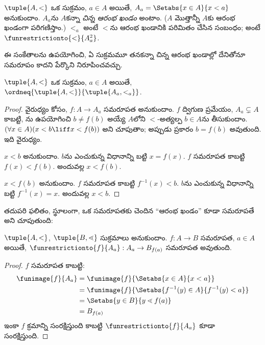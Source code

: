 \documentclass[../../../include/open-logic-section]{subfiles}
\begin{document}
\begin{defn}
$\tuple{A, <}$ ఒక సుక్రమం,
$a \in A$ అయితే,
$A_a = \Setabs{x \in A}{x
< a}$ అనుకుందాం.
$A_a$ను $A$కన్నా \emph{చిన్న ఆరంభ ఖండం} అంటాం.
($A$ మొత్తాన్నీ $A$కు ఆరంభ ఖండంగా పరిగణిస్తాం.) $<_a$
అంటే $<$ను ఆరంభ
ఖండానికి పరిమితం
చేసిన సంబంధం; అంటే
$\funrestrictionto{\mathord{<}}{A_a^2}$.
\end{defn}
\noindent
ఈ సంకేతాలను ఉపయోగించి, ఏ సుక్రమమూ
తనకన్నా చిన్న ఆరంభ ఖండాల్లో దేనితోనూ సమరూపం కాదని
పేర్కొని నిరూపించవచ్చు.

\begin{lem}
$\tuple{A, <}$ ఒక సుక్రమం,
$a \in A$ అయితే,
$\ordneq{\tuple{A, <}}{\tuple{A_a, <_a}}$.
\end{lem}

\begin{proof}
వైరుధ్యం కోసం,
$f \colon A \to A_a$
సమరూపత అనుకుందాం.
$f$ ద్విగుణ ప్రమేయం,
$A_a \subsetneq A$ కాబట్టి,
ను
ఉపయోగించి $b \neq f(b)$
అయ్యే $A$లోని $<$-అత్యల్ప
$b \in A$ను తీసుకుందాం.
$(\forall x \in A)(x<b \liff x < f(b))$
అని చూపుతాం; అప్పుడు
ప్రకారం $b =
f(b)$ అవుతుంది. ఇది వైరుధ్యం.

$x < b$ అనుకుందాం.
$b$ను ఎంచుకున్న విధానాన్ని బట్టి
$x = f(x)$.
$f$ సమరూపత కాబట్టి
$f(x) <
f(b)$. అందువల్ల
$x < f(b)$.

$x < f(b)$ అనుకుందాం.
$f$ సమరూపత కాబట్టి
$f^{-1}(x) < b$.
$b$ను ఎంచుకున్న విధానాన్ని బట్టి
$f^{-1}(x) = x$.
అందువల్ల $x < b$.
\end{proof}

తదుపరి ఫలితం, స్థూలంగా,
ఒక సమరూపతకు చెందిన ``ఆరంభ
ఖండం'' కూడా సమరూపతే
అని చూపుతుంది:

\begin{lem}
$\tuple{A, <}$,
$\tuple{B, \lessdot}$
సుక్రమాలు అనుకుందాం.
$f
\colon A \to B$ సమరూపత,
$a \in A$ అయితే,
$\funrestrictionto{f}{A_{a}} : A_a \to B_{f(a)}$
సమరూపత అవుతుంది.
\end{lem}

\begin{proof}
$f$ సమరూపత కాబట్టి:
\begin{align*}
	\funimage{f}{A_a} &= \funimage{f}{\Setabs{x \in A}{x < a}}\\
	&= \funimage{f}{\Setabs{f^{-1}(y) \in A}{f^{-1}(y) < a}} \\
	&= \Setabs{y \in B}{y \lessdot f(a)} \\
	&=B_{f(a)} 
\end{align*}
ఇంకా $f$ క్రమాన్ని
సంరక్షిస్తుంది కాబట్టి
$\funrestrictionto{f}{A_a}$
కూడా సంరక్షిస్తుంది.
\end{proof}
\end{document}
